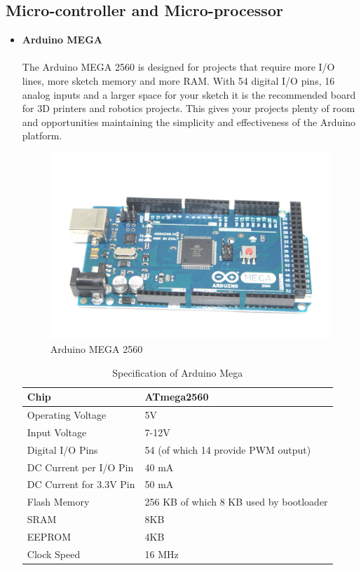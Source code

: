\subsection{Micro-controller and Micro-processor}
\begin{itemize}[wide, labelwidth=!, labelindent=0pt]
    \item \textbf{Arduino MEGA}
    \vspace{-0.5cm}
    \paragraph{}The Arduino MEGA 2560 is designed for projects that require more I/O lines, more sketch memory and more RAM. With 54 digital I/O pins, 16 analog inputs and a larger space for your sketch it is the recommended board for 3D printers and robotics projects. This gives your projects plenty of room and opportunities maintaining the simplicity and effectiveness of the Arduino platform.

    \begin{figure}[H]
    \centering
    \includegraphics[width = 11cm]{project/images/arduino_mega.jpg}
    \caption{Arduino MEGA 2560}
    \end{figure}
    
    \begin{table}[htbp]
    \caption{Specification of Arduino Mega}
    \begin{center}
    \begin{tabular}{|p{5cm}|p{9cm}|}
    \hline Chip & ATmega2560\\
    \hline Operating Voltage & 5V\\
    \hline Input Voltage & 7-12V\\
    \hline Digital I/O Pins & 54 (of which 14 provide PWM output)\\
    \hline DC Current per I/O Pin & 40 mA\\
    \hline DC Current for 3.3V Pin & 50 mA\\
    \hline Flash Memory & 256 KB of which 8 KB used by bootloader\\
    \hline SRAM & 8KB\\
    \hline EEPROM & 4KB\\
    \hline Clock Speed & 16 MHz\\
    \hline
    \end{tabular}
    \end{center}
    \end{table}
    

\end{itemize}

